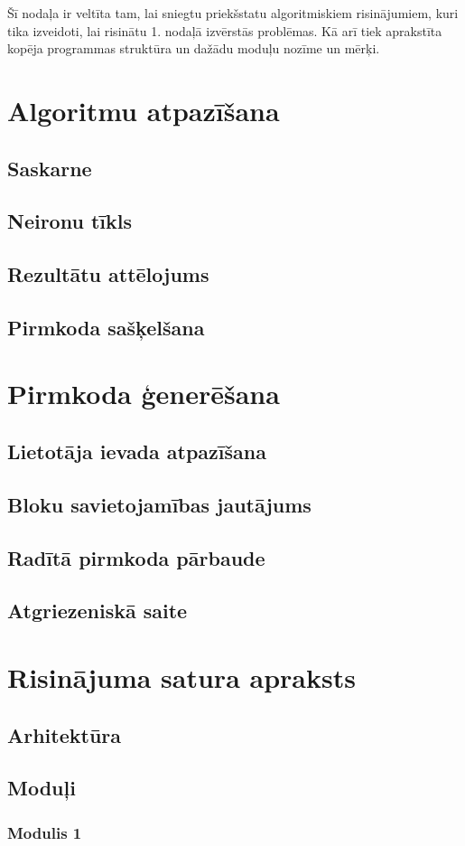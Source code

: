 Šī nodaļa ir veltīta tam, lai sniegtu priekšstatu algoritmiskiem risinājumiem, kuri tika izveidoti, lai risinātu 1. nodaļā izvērstās problēmas. Kā arī tiek aprakstīta kopēja programmas struktūra un dažādu moduļu nozīme un mērķi.
\section{Algoritmu atpazīšana}

\subsection{Saskarne}

\subsection{Neironu tīkls}

\subsection{Rezultātu attēlojums}

\subsection{Pirmkoda sašķelšana}

\section{Pirmkoda ģenerēšana}

\subsection{Lietotāja ievada atpazīšana}

\subsection{Bloku savietojamības jautājums}

\subsection{Radītā pirmkoda pārbaude}

\subsection{Atgriezeniskā saite}

\section{Risinājuma satura apraksts}

\subsection{Arhitektūra}

\subsection{Moduļi}

\subsubsection{Modulis 1}